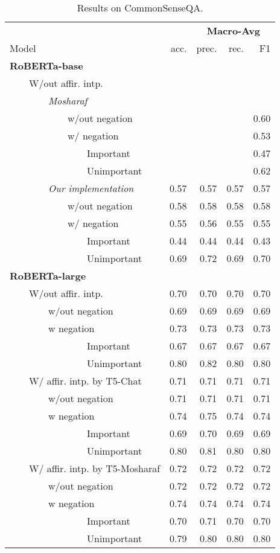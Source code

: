 
\begin{table*}
\centering
\begin{tabular}{lrrrr}
\toprule
&& \multicolumn{3}{c}{\textbf{Macro-Avg}} \\
Model & acc. & prec. & rec. & F1 \\
\midrule
\textbf{RoBERTa-base} \\
~~~~W/out affir. intp. \\
~~~~~~~~\textit{Mosharaf} \\
~~~~~~~~~~~~w/out negation &&&& 0.60\\ 
~~~~~~~~~~~~w/ negation &&&&0.53\\ 
~~~~~~~~~~~~~~~~Important &&&&0.47\\ 
~~~~~~~~~~~~~~~~Unimportant &&&&0.62\\ 
\midrule
~~~~~~~~\textit{Our implementation}  & 0.57 & 0.57 & 0.57 & 0.57 \\ 
~~~~~~~~~~~~w/out negation & 0.58 & 0.58 & 0.58 & 0.58 \\
~~~~~~~~~~~~w/ negation  & 0.55 & 0.56 & 0.55 & 0.55 \\ 
~~~~~~~~~~~~~~~~Important  & 0.44 & 0.44 & 0.44 & 0.43 \\ 
~~~~~~~~~~~~~~~~Unimportant  & 0.69 & 0.72 & 0.69 & 0.70 \\ 
\bottomrule
\textbf{RoBERTa-large} \\
~~~~W/out affir. intp.  & 0.70 & 0.70 & 0.70 & 0.70 \\ 
~~~~~~~~w/out negation  & 0.69 & 0.69 & 0.69 & 0.69 \\
~~~~~~~~w negation  & 0.73 & 0.73 & 0.73 & 0.73 \\ 
~~~~~~~~~~~~~~~~Important  & 0.67 & 0.67 & 0.67 & 0.67 \\  
~~~~~~~~~~~~~~~~Unimportant  & 0.80 & 0.82 & 0.80 & 0.80 \\  
\midrule
~~~~W/ affir. intp. by T5-Chat & 0.71 & 0.71 & 0.71 & 0.71 \\
~~~~~~~~w/out negation & 0.71 & 0.71 & 0.71 & 0.71 \\ 
~~~~~~~~w negation  & 0.74 & 0.75 & 0.74 & 0.74 \\
~~~~~~~~~~~~~~~~Important & 0.69 & 0.70 & 0.69 & 0.69 \\
~~~~~~~~~~~~~~~~Unimportant  & 0.80 & 0.81 & 0.80 & 0.80 \\ 
\midrule
~~~~W/ affir. intp. by T5-Mosharaf & 0.72 & 0.72 & 0.72 & 0.72 \\
~~~~~~~~w/out negation & 0.72 & 0.72 & 0.72 & 0.72 \\ 
~~~~~~~~w negation & 0.74 & 0.74 & 0.74 & 0.74 \\ 
~~~~~~~~~~~~~~~~Important & 0.70 & 0.71 & 0.70 & 0.70\\ 
~~~~~~~~~~~~~~~~Unimportant & 0.79 & 0.80 & 0.80 & 0.80\\ 
\bottomrule
\end{tabular}
\caption{Results on CommonSenseQA.}
\end{table*}